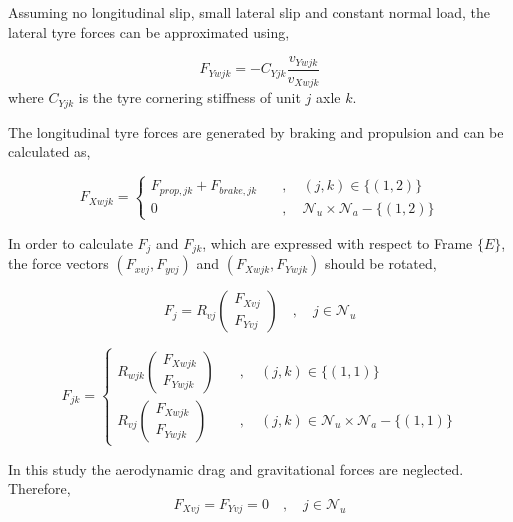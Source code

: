 \documentclass[12pt]{article}
\begin{document}
Assuming no longitudinal slip, small lateral slip and constant normal load, the lateral tyre forces can be approximated using, 

\begin{equation}\label{Lateral_Force_Results}
    F_{Ywjk} = - C_{Yjk} \frac{v_{Ywjk}}{v_{Xwjk}}
\end{equation}
where $C_{Yjk}$ is the tyre cornering stiffness of unit $j$ axle $k$.

The longitudinal tyre forces are generated by braking and propulsion and can be calculated as,

\begin{equation}\label{Forces_long_eq}
    F_{Xwjk} = \begin{cases} 
        F_{prop,jk} + F_{brake,jk} \quad &, \quad (j,k) \in \{  (1,2) \} \\
        0 \quad &, \quad \mathcal{N}_u \times \mathcal{N}_a - \{  (1,2) \}
    \end{cases}
\end{equation}

In order to calculate $F_j$ and $F_{jk}$, which are expressed with respect to Frame $\{ E \}$, the force vectors $(F_{xvj},F_{yvj})$ and $(F_{Xwjk},F_{Ywjk})$ should be rotated,

\begin{equation}
    F_j = R_{vj}\begin{pmatrix} F_{Xvj} \\ F_{Yvj} \end{pmatrix} \quad , \quad j \in \mathcal{N}_u
\end{equation}

\begin{equation}
    F_{jk} = \begin{cases}
         R_{wjk} \begin{pmatrix} F_{Xwjk} \\ F_{Ywjk} \end{pmatrix} \quad &, \quad (j,k) \in \{ (1,1) \} \\
        R_{vj} \begin{pmatrix} F_{Xwjk} \\ F_{Ywjk} \end{pmatrix} \quad &, \quad (j,k) \in \mathcal{N}_u \times \mathcal{N}_a - \{ (1,1) \}
    \end{cases}
\end{equation}

In this study the aerodynamic drag and gravitational forces are neglected. Therefore,
\begin{equation}
    F_{Xvj} = F_{Yvj} = 0 \quad , \quad j \in \mathcal{N}_u
\end{equation}
\end{document}
